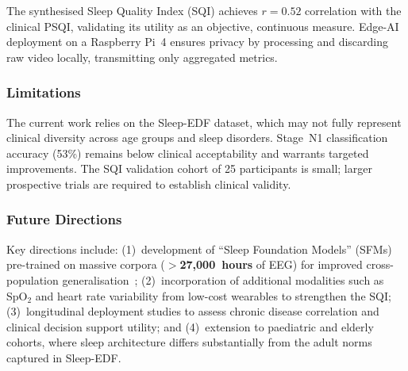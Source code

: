\documentclass[10pt, a4paper, twocolumn]{article}
\begin{document}
The synthesised Sleep Quality Index (SQI) achieves $r = 0.52$ correlation with the
clinical PSQI, validating its utility as an objective, continuous measure. Edge-AI
deployment on a Raspberry Pi~4 ensures privacy by processing and discarding raw
video locally, transmitting only aggregated metrics.

\subsubsection{Limitations}
The current work relies on the Sleep-EDF dataset, which may not fully represent
clinical diversity across age groups and sleep disorders. Stage~N1 classification
accuracy (53\%) remains below clinical acceptability and warrants targeted
improvements. The SQI validation cohort of 25 participants is small; larger
prospective trials are required to establish clinical validity.

\subsubsection{Future Directions}
Key directions include: (1)~development of ``Sleep Foundation Models'' (SFMs)
pre-trained on massive corpora (\textbf{$>$27,000~hours} of EEG) for improved
cross-population generalisation~\cite{ref9}; (2)~incorporation of additional
modalities such as SpO$_2$ and heart rate variability from low-cost wearables to
strengthen the SQI; (3)~longitudinal deployment studies to assess chronic disease
correlation and clinical decision support utility; and (4)~extension to paediatric
and elderly cohorts, where sleep architecture differs substantially from the adult
norms captured in Sleep-EDF.
\end{document}
